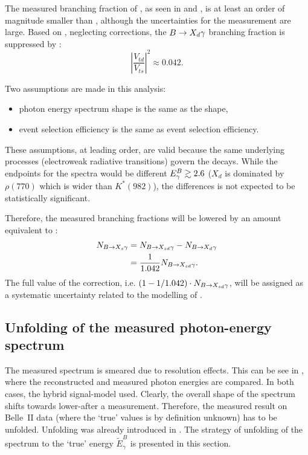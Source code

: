 The measured branching fraction of \BtoXdgamma, 
as seen in  and , is at least an order of magnitude smaller than \BtoXsgamma,
although the uncertainties for the measurement are large.
Based on , neglecting corrections, the $\BtoXdgamma$ branching fraction
is suppressed by \cite{Workman:2022ynf}:
\begin{equation}\label{eq:btodgamma_suppression}
    \left|\frac{V_{td}}{V_{ts}}\right|^2 \approx 0.042.
\end{equation}

Two assumptions are made in this analysis:
\begin{itemize}
    \item \BtoXdgamma photon energy spectrum shape is the same as the \BtoXsgamma shape,
    \item \BtoXdgamma event selection efficiency is the same as \BtoXsgamma event selection efficiency.
\end{itemize}
These assumptions, at leading order, are valid because the same underlying processes (electroweak radiative transitions) govern the decays.
While the endpoints for the spectra would be different ${E^B_{\gamma}}\gtrsim2.6$ ($X_d$ is dominated by $\rho(770)$ 
which is wider than $K^*(982)$), the differences is not expected to be statistically significant.

Therefore, the measured \BtoXsdgamma branching fractions will be lowered by an amount equivalent to :
\begin{align}
    \begin{split}
    N_{\BtoXsgamma} &= N_{\BtoXsdgamma} - N_{\BtoXdgamma}\\
                    &=\frac{1}{1.042} N_{\BtoXsdgamma}.
    \end{split}
\end{align}
The full value of the correction, i.e. $(1-1/1.042) \cdot N_{\BtoXsdgamma}$, will be assigned as a systematic uncertainty related to the modelling of \BtoXdgamma.

\subsection{Unfolding of the measured photon-energy spectrum} \label{sec:signal_unfolding}

The measured \EB spectrum is smeared due to resolution effects.
This can be see in , where the reconstructed and measured photon energies are compared.
In both cases, the hybrid signal-model used.
Clearly, the overall shape of the spectrum shifts towards lower-\EB after a measurement.
Therefore, the measured result on Belle~II data (where the `true' values is by definition unknown) has to be unfolded.
Unfolding was already introduced in .
The strategy of unfolding of the \EB spectrum to the `true' energy $\tilde{E}_{\gamma}^B$ is presented in this section.

